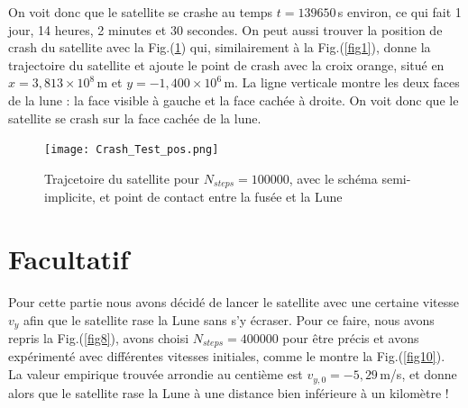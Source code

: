 \documentclass[a4paper,12pt,twoside]{article}
\begin{document}
On voit donc que le satellite se crashe au temps $t=139650$\,s environ, ce qui fait 1 jour, 14 heures, 2 minutes et 30 secondes. On peut aussi trouver la position de crash du satellite avec la Fig.(\ref{fig9}) qui, similairement à la Fig.(\ref{fig1}), donne la trajectoire du satellite et ajoute le point de crash avec la croix orange, situé en $x=3,813 \times 10^8$\,m et $y=-1,400 \times 10^6$\,m. La ligne verticale montre les deux faces de la lune : la face visible à gauche et la face cachée à droite. On voit donc que le satellite se crash sur la face cachée de la lune.

\begin{figure}[H]
    \centering
    \texttt{[image: Crash\_Test\_pos.png]}
    \captionsetup{justification=centering}
    \caption{Trajcetoire du satellite pour $N_{steps}=100000$, avec le schéma semi-implicite, et point de contact entre la fusée et la Lune}
    \label{fig9}
\end{figure}
\vspace{-1cm}
\section{Facultatif}

Pour cette partie nous avons décidé de lancer le satellite avec une certaine vitesse $v_y$ afin que le satellite rase la Lune sans s'y écraser. Pour ce faire, nous avons repris la Fig.(\ref{fig8}), avons choisi $N_{steps}=400000$ pour être précis et avons expérimenté avec différentes vitesses initiales, comme le montre la Fig.(\ref{fig10}). La valeur empirique trouvée arrondie au centième est $v_{y,0}=-5,29$\,m/s, et donne alors que le satellite rase la Lune à une distance bien inférieure à un kilomètre !

\clearpage
\end{document}
